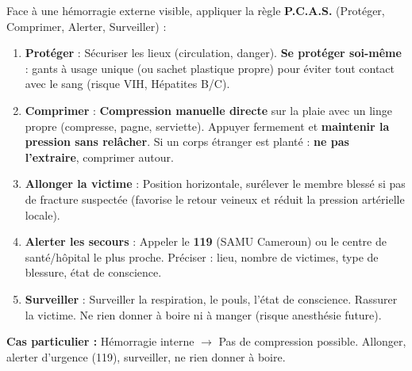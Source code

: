 \documentclass[11pt]{article}
\begin{document}
\begin{methode}
Face à une hémorragie externe visible, appliquer la règle \textbf{P.C.A.S.} (Protéger, Comprimer, Alerter, Surveiller) :
\begin{enumerate}
\item \textbf{Protéger} : Sécuriser les lieux (circulation, danger). \textbf{Se protéger soi-même} : gants à usage unique (ou sachet plastique propre) pour éviter tout contact avec le sang (risque VIH, Hépatites B/C).
\item \textbf{Comprimer} : \textbf{Compression manuelle directe} sur la plaie avec un linge propre (compresse, pagne, serviette). Appuyer fermement et \textbf{maintenir la pression sans relâcher}. Si un corps étranger est planté : \textbf{ne pas l'extraire}, comprimer autour.
\item \textbf{Allonger la victime} : Position horizontale, surélever le membre blessé si pas de fracture suspectée (favorise le retour veineux et réduit la pression artérielle locale).
\item \textbf{Alerter les secours} : Appeler le \textbf{119} (SAMU Cameroun) ou le centre de santé/hôpital le plus proche. Préciser : lieu, nombre de victimes, type de blessure, état de conscience.
\item \textbf{Surveiller} : Surveiller la respiration, le pouls, l'état de conscience. Rassurer la victime. Ne rien donner à boire ni à manger (risque anesthésie future).
\end{enumerate}
\textbf{Cas particulier :} Hémorragie interne $\rightarrow$ Pas de compression possible. Allonger, alerter d'urgence (119), surveiller, ne rien donner à boire.
\end{methode}
\end{document}

